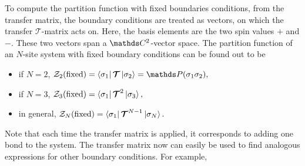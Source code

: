 \documentclass{homework}
\begin{document}
To compute the partition function with fixed boundaries conditions, from the transfer matrix, the boundary conditions are treated as vectors, on which the transfer $\bm{\mathcal{T}}$-matrix acts on. Here, the basis elements are the two spin values $+$ and $-$. These two vectors span a $\ctwo$-vector space. The partition function of an $N$-site system with fixed boundary conditions can be found out to be 

\begin{itemize}
    \item if $N=2$,
        $
        \mathcal{Z}_2(\textnormal{fixed}) = \bra{\sigma_1} \bm{\mathcal{T}} \ket{\sigma_2} = \prob(\sigma_1 \sigma_2),
        $
    \item if $N=3$,
        $
        \mathcal{Z}_3(\textnormal{fixed}) = \bra{\sigma_1} \bm{\mathcal{T}}^2 \ket{\sigma_3},
        $
    \item in general,
        $
        \mathcal{Z}_N(\textnormal{fixed}) = \bra{\sigma_1} \bm{\mathcal{T}}^{N-1} \ket{\sigma_N}.
        $
\end{itemize}

Note that each time the transfer matrix is applied, it corresponds to adding one bond to the system. The transfer matrix now can easily be used to find analogous expressions for other boundary conditions. For example, \\
\end{document}
